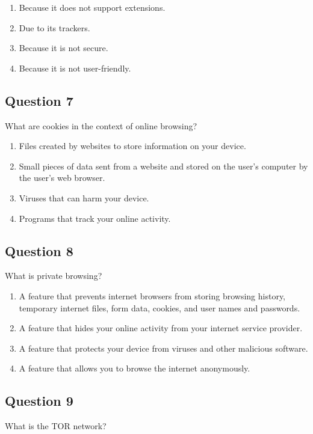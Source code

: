 \documentclass[12pt,a4paper]{article}
\begin{document}
\begin{enumerate}[label=\Alph*., leftmargin=*]
\item Because it does not support extensions.
\item Due to its trackers.
\item Because it is not secure.
\item Because it is not user-friendly.
\end{enumerate}

\bigskip


\subsection*{Question 7}
What are cookies in the context of online browsing?

\begin{enumerate}[label=\Alph*., leftmargin=*]
\item Files created by websites to store information on your device.
\item Small pieces of data sent from a website and stored on the user's computer by the user's web browser.
\item Viruses that can harm your device.
\item Programs that track your online activity.
\end{enumerate}

\bigskip


\subsection*{Question 8}
What is private browsing?

\begin{enumerate}[label=\Alph*., leftmargin=*]
\item A feature that prevents internet browsers from storing browsing history, temporary internet files, form data, cookies, and user names and passwords.
\item A feature that hides your online activity from your internet service provider.
\item A feature that protects your device from viruses and other malicious software.
\item A feature that allows you to browse the internet anonymously.
\end{enumerate}

\bigskip


\subsection*{Question 9}
What is the TOR network?
\end{document}
